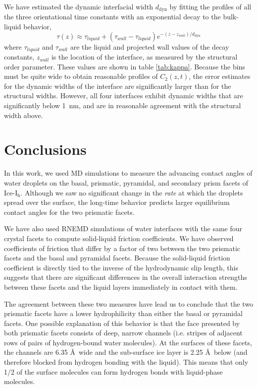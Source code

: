We have estimated the dynamic interfacial width $d_\mathrm{dyn}$ by
fitting the profiles of all the three orientational time constants
with an exponential decay to the bulk-liquid behavior,
\begin{equation}\label{tauFit2}
  \tau(z)\approx\tau_{liquid}+(\tau_{wall}-\tau_{liquid})e^{-(z-z_{wall})/d_\mathrm{dyn}}
\end{equation}
where $\tau_{liquid}$ and $\tau_{wall}$ are the liquid and projected
wall values of the decay constants, $z_{wall}$ is the location of the
interface, as measured by the structural order parameter.  These
values are shown in table \ref{tab:kappa}. Because the bins must be
quite wide to obtain reasonable profiles of $C_2(z,t)$, the error
estimates for the dynamic widths of the interface are significantly
larger than for the structural widths.  However, all four interfaces
exhibit dynamic widths that are significantly below 1~nm, and are in
reasonable agreement with the structural width above.

\section{Conclusions}
In this work, we used MD simulations to measure the advancing contact
angles of water droplets on the basal, prismatic, pyramidal, and
secondary prism facets of Ice-I$_\mathrm{h}$.  Although we saw no
significant change in the \textit{rate} at which the droplets spread
over the surface, the long-time behavior predicts larger equilibrium
contact angles for the two prismatic facets.  

We have also used RNEMD simulations of water interfaces with the same
four crystal facets to compute solid-liquid friction coefficients.  We
have observed coefficients of friction that differ by a factor of two
between the two prismatic facets and the basal and pyramidal facets.
Because the solid-liquid friction coefficient is directly tied to the
inverse of the hydrodynamic slip length, this suggests that there are
significant differences in the overall interaction strengths between
these facets and the liquid layers immediately in contact with them.

The agreement between these two measures have lead us to conclude that
the two prismatic facets have a lower hydrophilicity than either the
basal or pyramidal facets.  One possible explanation of this behavior
is that the face presented by both prismatic facets consists of deep,
narrow channels (i.e. stripes of adjacent rows of pairs of
hydrogen-bound water molecules).  At the surfaces of these facets,
the channels are 6.35 \AA\ wide and the sub-surface ice layer is 2.25
\AA\ below (and therefore blocked from hydrogen bonding with the
liquid).  This means that only 1/2 of the surface molecules can form
hydrogen bonds with liquid-phase molecules.

